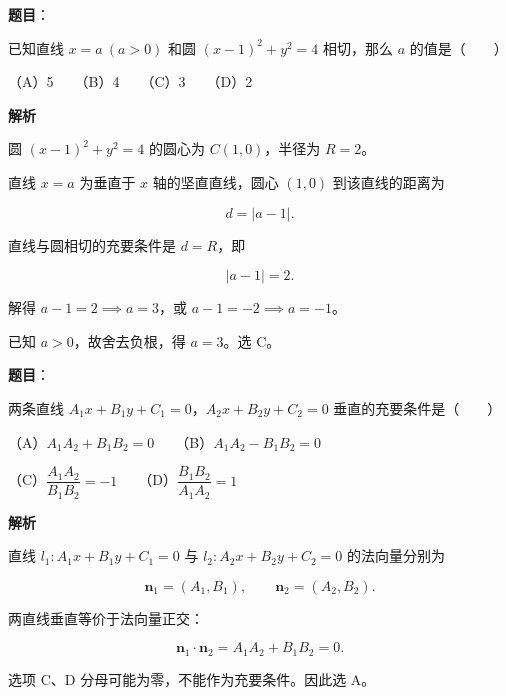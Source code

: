 \begin{answer}

\textbf{题目}：

已知直线 $x=a\ (a>0)$ 和圆 $(x-1)^2+y^2=4$ 相切，那么 $a$ 的值是\mbox{（　　）}

（A）5　　（B）4　　（C）3　　（D）2

\textbf{解析}

圆 $(x-1)^2+y^2=4$ 的圆心为 $C(1,0)$，半径为 $R=2$。

直线 $x=a$ 为垂直于 $x$ 轴的坚直直线，圆心 $(1,0)$ 到该直线的距离为

\nopagebreak[4]
\[
d = |a - 1|.
\]

直线与圆相切的充要条件是 $d=R$，即

\nopagebreak[4]
\[
|a - 1| = 2.
\]

解得 $a-1=2 \implies a=3$，或 $a-1=-2 \implies a=-1$。

已知 $a>0$，故舍去负根，得 $a=3$。选 C。


\end{answer}
\begin{answer}

\textbf{题目}：

两条直线 $A_1x+B_1y+C_1=0$，$A_2x+B_2y+C_2=0$ 垂直的充要条件是\mbox{（　　）}

（A）$A_1A_2+B_1B_2=0$　　（B）$A_1A_2-B_1B_2=0$

（C）$\dfrac{A_1A_2}{B_1B_2}=-1$　　（D）$\dfrac{B_1B_2}{A_1A_2}=1$

\textbf{解析}

直线 $l_1\colon A_1x+B_1y+C_1=0$ 与 $l_2\colon A_2x+B_2y+C_2=0$ 的法向量分别为

\nopagebreak[4]
\[
\boldsymbol{n}_1 = (A_1, B_1),\qquad \boldsymbol{n}_2 = (A_2, B_2).
\]

两直线垂直等价于法向量正交：

\nopagebreak[4]
\[
\boldsymbol{n}_1 \cdot \boldsymbol{n}_2 = A_1A_2 + B_1B_2 = 0.
\]

选项 C、D 分母可能为零，不能作为充要条件。因此选 A。


\end{answer}
